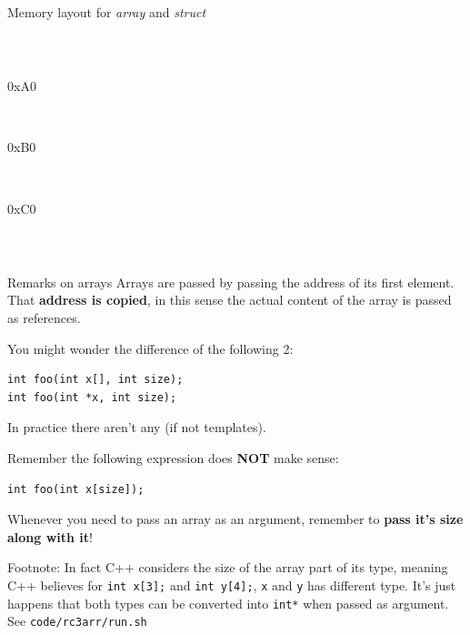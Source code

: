 \begin{frame}[fragile]{Memory layout for \textit{array} and \textit{struct}}
\begin{columns}
\begin{bytefield}[leftcurly=., leftcurlyspace=0pt]{16}
	\\
	\begin{leftwordgroup}{0xA0}
	\end{leftwordgroup}\\
	\begin{leftwordgroup}{0xB0}
	\end{leftwordgroup}\\
	\begin{leftwordgroup}{0xC0}
	\end{leftwordgroup}\\
\end{bytefield}
\end{columns}
\end{frame}

\begin{frame}[fragile]{Remarks on arrays}
Arrays are passed by passing the address of its first element. That \textbf{address is copied}, in this sense the actual content of the array is passed as references. 



You might wonder the difference of the following 2: 

\begin{verbatim}
int foo(int x[], int size);
int foo(int *x, int size);
\end{verbatim}

In practice there aren't any (if not templates).

Remember the following expression does \textbf{NOT} make sense:
\begin{verbatim}
int foo(int x[size]);
\end{verbatim}

Whenever you need to pass an array as an argument, remember to \textbf{pass it's size along with it}! 

\small{Footnote: In fact C++ considers the size of the array part of its type, meaning C++ believes for \texttt{int x[3];} and \texttt{int y[4];}, \texttt{x} and \texttt{y} has different type. It's just happens that both types can be converted into \texttt{int*} when passed as argument. See \texttt{code/rc3arr/run.sh}}
\end{frame}

